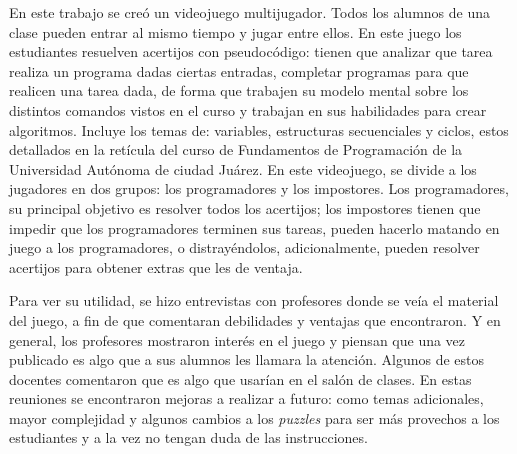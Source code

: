 En este trabajo se creó un videojuego multijugador. Todos los alumnos de una clase pueden entrar al mismo tiempo y jugar entre ellos. En este juego los estudiantes resuelven acertijos con pseudocódigo: tienen que analizar que tarea realiza un programa dadas ciertas entradas, completar programas para que realicen una tarea dada, de forma que trabajen su modelo mental sobre los distintos comandos vistos en el curso y trabajan en sus habilidades para crear algoritmos. Incluye los temas de: variables, estructuras secuenciales y ciclos, estos detallados en la retícula del curso de Fundamentos de Programación de la Universidad Autónoma de ciudad Juárez. En este videojuego, se divide a los jugadores en dos grupos: los programadores y los impostores. Los programadores, su principal objetivo es resolver todos los acertijos; los impostores tienen que impedir que los programadores terminen sus tareas, pueden hacerlo matando en juego a los programadores, o distrayéndolos, adicionalmente, pueden resolver acertijos para obtener extras que les de ventaja. 

Para ver su utilidad, se hizo entrevistas con profesores donde se veía el material del juego, a fin de que comentaran debilidades y ventajas que encontraron. Y en general, los profesores mostraron interés en el juego y piensan que una vez publicado es algo que a sus alumnos les llamara la atención. Algunos de estos docentes comentaron que es algo que usarían en el salón de clases. En estas reuniones se encontraron mejoras a realizar a futuro: como temas adicionales, mayor complejidad y algunos cambios a los \textit{puzzles} para ser más provechos a los estudiantes y a la vez no tengan duda de las instrucciones.
